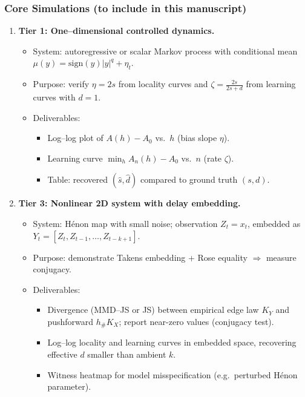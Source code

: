 \documentclass[11pt]{article}
\newcommand{\1}{\mathbf{1}}
\begin{document}
\subsubsection{Core Simulations (to include in this manuscript)}
\begin{enumerate}
    \item \textbf{Tier 1: One--dimensional controlled dynamics.} 
    \begin{itemize}
        \item System: autoregressive or scalar Markov process with conditional mean $\mu(y) = \mathrm{sign}(y)|y|^q + \eta_t$.
        \item Purpose: verify $\eta = 2s$ from locality curves and $\zeta = \tfrac{2s}{2s+d}$ from learning curves with $d=1$.
        \item Deliverables: 
            \begin{itemize}
                \item Log--log plot of $A(h)-A_0$ vs.\ $h$ (bias slope $\eta$).
                \item Learning curve $\min_h A_n(h)-A_0$ vs.\ $n$ (rate $\zeta$).
                \item Table: recovered $(\hat s, \hat d)$ compared to ground truth $(s,d)$.
            \end{itemize}
    \end{itemize}
    
    \item \textbf{Tier 3: Nonlinear 2D system with delay embedding.}
    \begin{itemize}
        \item System: H\'enon map with small noise; observation $Z_t = x_t$, embedded as $Y_t = [Z_t, Z_{t-1}, \dots, Z_{t-k+1}]$.
        \item Purpose: demonstrate Takens embedding + Rose equality $\Rightarrow$ measure conjugacy.
        \item Deliverables:
            \begin{itemize}
                \item Divergence (MMD--JS or JS) between empirical edge law $K_Y$ and pushforward $h_\#K_X$; report near-zero values (conjugacy test).
                \item Log--log locality and learning curves in embedded space, recovering effective $d$ smaller than ambient $k$.
                \item Witness heatmap for model misspecification (e.g.\ perturbed H\'enon parameter).
            \end{itemize}
    \end{itemize}


\end{enumerate}
\end{document}

